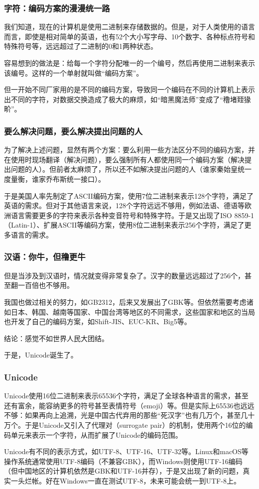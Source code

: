 \documentclass[fontset=none,aspectratio=1610]{ctexbeamer}
\begin{document}
\begin{frame}
    \frametitle{字符：编码方案的漫漫统一路}

    我们知道，现在的计算机是使用二进制来存储数据的。但是，对于人类使用的语言而言，即使是相对简单的英语，也有52个大小写字母、10个数字、各种标点符号和特殊符号等，远远超过了二进制的0和1两种状态。

    容易想到的做法是：给每一个字符分配唯一的一个编号，然后再使用二进制来表示该编号。这样的一个单射就叫做“编码方案”。

    但一开始不同厂家用的是不同的编码方案，导致同一个编码在不同的计算机上表示出不同的字符，对数据交换造成了极大的麻烦，如“暗黑魔法师”变成了“穞堵臸猭畍”。

\end{frame}

\begin{frame}
    \frametitle{要么解决问题，要么解决提出问题的人}

    为了解决上述问题，显然有两个方案：要么利用一些方法区分不同的编码方案，并在使用时现场翻译（解决问题），要么强制所有人都使用同一个编码方案（解决提出问题的人）。但前者太麻烦了，所以还不如解决提出问题的人（谁家秦始皇统一度量衡，谁家乔布斯统一接口）。

    于是美国人率先制定了ASCII编码方案，使用7位二进制来表示128个字符，满足了英语的需求。但对于其他语言来说，128个字符远远不够用，例如法语、德语等欧洲语言需要更多的字符来表示各种变音符号和特殊字符。于是又出现了ISO 8859-1（Latin-1）、扩展ASCII等编码方案，使用8位二进制来表示256个字符，满足了更多语言的需求。

\end{frame}

\begin{frame}
    \frametitle{汉语：你牛，但穞更牛}

    但是当涉及到汉语时，情况就变得非常复杂了。汉字的数量远远超过了256个，甚至翻一百倍也不够用。

    我国也做过相关的努力，如GB2312，后来又发展出了GBK等。但依然需要考虑诸如日本、韩国、越南等国家、中国台湾等地区的不同需求，这些国家和地区的当局也开发了自己的编码方案，如Shift-JIS、EUC-KR、Big5等。

    结论：感觉不如世界人民大团结。

    于是，Unicode诞生了。

\end{frame}

\begin{frame}
    \frametitle{Unicode}

    Unicode使用16位二进制来表示65536个字符，满足了全球各种语言的需求，甚至还有富余，能容纳更多的符号甚至表情符号（emoji）等。但是实际上65536也远远不够：如果再向上追溯，光是中国古代弃用的那些“死汉字”也有几万个，甚至几十万个。于是Unicode又引入了代理对（surrogate pair）的机制，使用两个16位的编码单元来表示一个字符，从而扩展了Unicode的编码范围。

    Unicode有不同的表示方式，如UTF-8、UTF-16、UTF-32等。Linux和macOS等操作系统通常使用UTF-8编码（不兼容GBK），而Windows则使用UTF-16编码（但中国地区的计算机依然是GBK和UTF-16并存），于是又出现了新的问题，真实一头烂帐。好在Windows一直在测试UTF-8，未来可能会统一到UTF-8上。

\end{frame}
\end{document}
